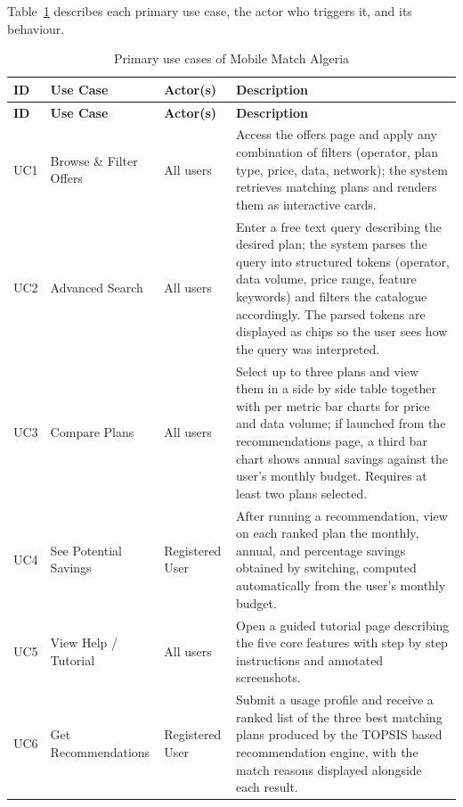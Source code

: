 Table~\ref{tab:usecases} describes each primary use case, the actor who triggers it, and its behaviour.

{\small
\begin{longtable}{|p{1.1cm}|p{3.8cm}|p{2.8cm}|p{6.0cm}|}
  \caption{Primary use cases of Mobile Match Algeria}\label{tab:usecases}\\
    \hline
    \textbf{ID} & \textbf{Use Case} & \textbf{Actor(s)} & \textbf{Description} \\
    \hline
  \endfirsthead
    \hline
    \textbf{ID} & \textbf{Use Case} & \textbf{Actor(s)} & \textbf{Description} \\
    \hline
  \endhead
    UC1 & Browse \& Filter Offers     & All users         & Access the offers page and apply any combination of filters (operator, plan type, price, data, network); the system retrieves matching plans and renders them as interactive cards. \\
    \hline
    UC2 & Advanced Search             & All users         & Enter a free text query describing the desired plan; the system parses the query into structured tokens (operator, data volume, price range, feature keywords) and filters the catalogue accordingly. The parsed tokens are displayed as chips so the user sees how the query was interpreted. \\
    \hline
    UC3 & Compare Plans               & All users         & Select up to three plans and view them in a side by side table together with per metric bar charts for price and data volume; if launched from the recommendations page, a third bar chart shows annual savings against the user's monthly budget. Requires at least two plans selected. \\
    \hline
    UC4 & See Potential Savings       & Registered User   & After running a recommendation, view on each ranked plan the monthly, annual, and percentage savings obtained by switching, computed automatically from the user's monthly budget. \\
    \hline
    UC5 & View Help / Tutorial        & All users         & Open a guided tutorial page describing the five core features with step by step instructions and annotated screenshots. \\
    \hline
    UC6 & Get Recommendations         & Registered User   & Submit a usage profile and receive a ranked list of the three best matching plans produced by the TOPSIS based recommendation engine, with the match reasons displayed alongside each result. \\
    \hline

\end{longtable}}
